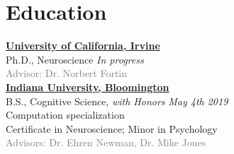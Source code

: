 \documentclass[10pt]{cooperCV2}
\begin{document}


\section{Education} 

\href{http://www.uci.edu/}{\textbf{University of California, Irvine}} \\
Ph.D., Neuroscience \hfill \textit{In progress}\\
\textcolor{grey}{Advisor: Dr. Norbert Fortin}\\




\href{http://www.iu.edu/}{\textbf{Indiana University, Bloomington}} \\
B.S., Cognitive Science, \textit{with Honors} \hfill \textit{May 4th 2019} \\
Computation specialization \\
Certificate in Neuroscience; Minor in Psychology\\
\textcolor{grey}{Advisors: Dr. Ehren Newman, Dr. Mike Jones}


\end{document}
